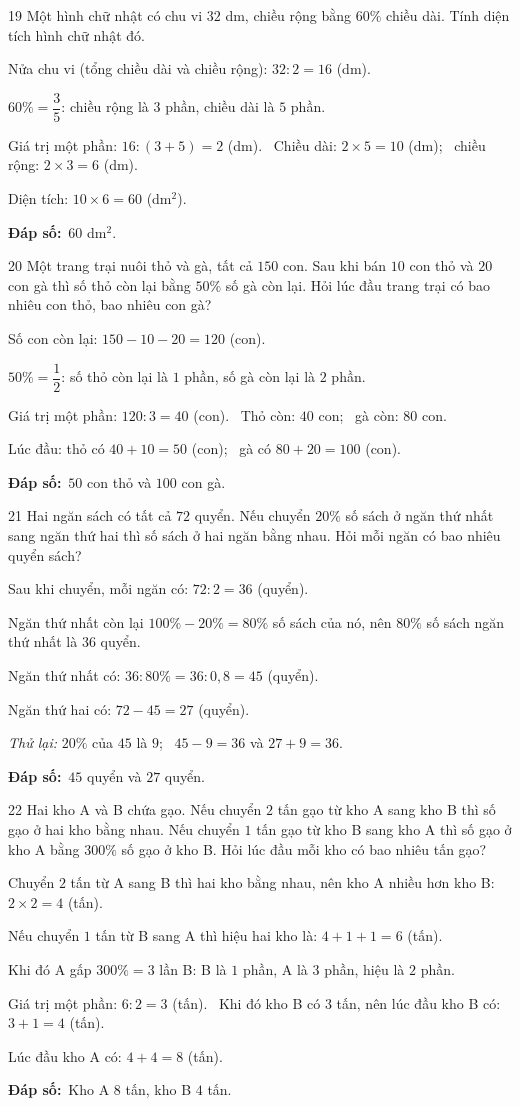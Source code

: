 \documentclass[11pt]{article}
\newif\ifsol \solfalse
\providecommand{\AnsWord}{Đáp số}
\newcommand{\dapso}[1]{\par\textbf{\AnsWord:}\ #1}
\newcommand{\probsol}[1]{%
  \begin{lrbox}{\solmeasure}\begin{minipage}{\dimexpr\linewidth-24pt\relax}#1\end{minipage}\end{lrbox}%
  \ifsol
    \begin{solbox}#1\end{solbox}%
  \else
    \setlength{\solht}{\dimexpr\ht\solmeasure+\dp\solmeasure+0.85cm\relax}%
    \ifdim\solht<1.35cm\setlength{\solht}{1.35cm}\fi
    \begin{tcolorbox}[colback=white,colframe=Line,boxrule=0.8pt,arc=5pt,
      left=8pt,right=8pt,top=4pt,bottom=4pt,height=\solht]{\footnotesize\color{Slate}\itshape\WorkWord}\end{tcolorbox}%
  \fi}
\newcommand{\gap}{\vspace{0.3cm}}
\def\WorkWord{Bài làm:}
\def\AnsWord{Đáp số}
\begin{document}
\gap
\begin{probbox}{19}{\relax}
Một hình chữ nhật có chu vi $32$ dm, chiều rộng bằng $60\%$ chiều dài. Tính diện tích hình chữ nhật đó.
\end{probbox}
\probsol{
Nửa chu vi (tổng chiều dài và chiều rộng): $32:2=16$ (dm).\par
$60\%=\dfrac35$: chiều rộng là $3$ phần, chiều dài là $5$ phần.\par
Giá trị một phần: $16:(3+5)=2$ (dm). \ Chiều dài: $2\times5=10$ (dm); \ chiều rộng: $2\times3=6$ (dm).\par
Diện tích: $10\times6=60$ (dm$^2$).
\dapso{$60$ dm$^2$.}}
\gap
\begin{probbox}{20}{\relax}
Một trang trại nuôi thỏ và gà, tất cả $150$ con. Sau khi bán $10$ con thỏ và $20$ con gà thì số thỏ còn lại bằng $50\%$ số gà còn lại. Hỏi lúc đầu trang trại có bao nhiêu con thỏ, bao nhiêu con gà?
\end{probbox}
\probsol{
Số con còn lại: $150-10-20=120$ (con).\par
$50\%=\dfrac12$: số thỏ còn lại là $1$ phần, số gà còn lại là $2$ phần.\par
Giá trị một phần: $120:3=40$ (con). \ Thỏ còn: $40$ con; \ gà còn: $80$ con.\par
Lúc đầu: thỏ có $40+10=50$ (con); \ gà có $80+20=100$ (con).
\dapso{$50$ con thỏ và $100$ con gà.}}
\gap
\begin{probbox}{21}{\relax}
Hai ngăn sách có tất cả $72$ quyển. Nếu chuyển $20\%$ số sách ở ngăn thứ nhất sang ngăn thứ hai thì số sách ở hai ngăn bằng nhau. Hỏi mỗi ngăn có bao nhiêu quyển sách?
\end{probbox}
\probsol{
Sau khi chuyển, mỗi ngăn có: $72:2=36$ (quyển).\par
Ngăn thứ nhất còn lại $100\%-20\%=80\%$ số sách của nó, nên $80\%$ số sách ngăn thứ nhất là $36$ quyển.\par
Ngăn thứ nhất có: $36:80\%=36:0{,}8=45$ (quyển).\par
Ngăn thứ hai có: $72-45=27$ (quyển).\par
\emph{Thử lại:} $20\%$ của $45$ là $9$; \ $45-9=36$ và $27+9=36$.
\dapso{$45$ quyển và $27$ quyển.}}
\gap
\begin{probbox}{22}{\relax}
Hai kho A và B chứa gạo. Nếu chuyển $2$ tấn gạo từ kho A sang kho B thì số gạo ở hai kho bằng nhau. Nếu chuyển $1$ tấn gạo từ kho B sang kho A thì số gạo ở kho A bằng $300\%$ số gạo ở kho B. Hỏi lúc đầu mỗi kho có bao nhiêu tấn gạo?
\end{probbox}
\probsol{
Chuyển $2$ tấn từ A sang B thì hai kho bằng nhau, nên kho A nhiều hơn kho B: $2\times2=4$ (tấn).\par
Nếu chuyển $1$ tấn từ B sang A thì hiệu hai kho là: $4+1+1=6$ (tấn).\par
Khi đó A gấp $300\%=3$ lần B: B là $1$ phần, A là $3$ phần, hiệu là $2$ phần.\par
Giá trị một phần: $6:2=3$ (tấn). \ Khi đó kho B có $3$ tấn, nên lúc đầu kho B có: $3+1=4$ (tấn).\par
Lúc đầu kho A có: $4+4=8$ (tấn).
\dapso{Kho A $8$ tấn, kho B $4$ tấn.}}
\end{document}
